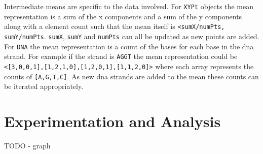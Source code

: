 \documentclass[12pt]{article}
\newcommand{\ttt}{\texttt}
\begin{document}
Intermediate means are specific to the data involved. For \ttt{XYPt} objects the mean representation is a sum of the x components and a sum of the y components along with a element count such that the mean itself is \ttt{<sumX/numPts, sumY/numPts}. \ttt{sumX}, \ttt{sumY} and \ttt{numPts} can all be updated as new points are added. For \ttt{DNA} the mean representation is a count of the bases for each base in the dna strand. For example if the strand is \ttt{AGGT} the mean representation could be \ttt{<[3,0,0,1],[1,2,1,0],[1,2,0,1],[1,1,2,0]>} where each array represents the counts of \ttt{[A,G,T,C]}. As new dna strands are added to the mean these counts can be iterated appropriately.


\section{Experimentation and Analysis}

TODO - graph
\end{document}
